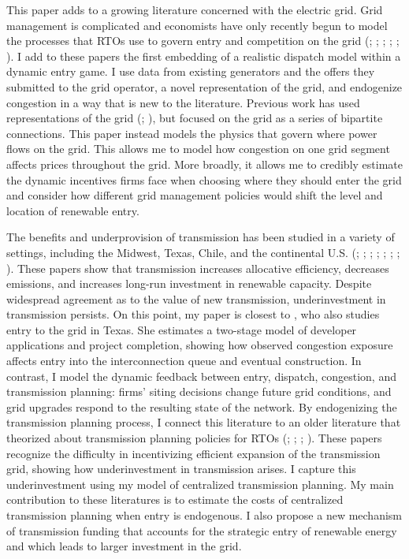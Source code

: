 \documentclass[12pt]{article}
\begin{document}
This paper adds to a growing literature concerned with the electric grid. Grid management is complicated and economists have only recently begun to model the processes that RTOs use to govern entry and competition on the grid (\cite{Wolak2015}; \cite{GowrisankaranReynoldsSamano2016}; \cite{Cicala2022}; \cite{Mays2023}; \cite{JohnstonLiuYang2024}; \cite{Boatwright2025}). I add to these papers the first embedding of a realistic dispatch model within a dynamic entry game. I use data from existing generators and the offers they submitted to the grid operator, a novel representation of the grid, and endogenize congestion in a way that is new to the literature. Previous work has used representations of the grid (\cite{ArkolakisWalsh2023}; \cite{Golden2026}), but focused on the grid as a series of bipartite connections. This paper instead models the physics that govern where power flows on the grid. This allows me to model how congestion on one grid segment affects prices throughout the grid. More broadly, it allows me to credibly estimate the dynamic incentives firms face when choosing where they should enter the grid and consider how different grid management policies would shift the level and location of renewable entry. 

The benefits and underprovision of transmission has been studied in a variety of settings, including the Midwest, Texas, Chile, and the continental U.S. (\cite{BorensteinBushnellStoft2000}; \cite{FellKafineNovan2021}; \cite{GonzalesItoReguant2023}; \cite{ArkolakisWalsh2023}; \cite{Hausman2024}; \cite{HollandMansurYates2024}; \cite{Boatwright2025}; \cite{Golden2026}). These papers show that transmission increases allocative efficiency, decreases emissions, and increases long-run investment in renewable capacity. Despite widespread agreement as to the value of new transmission, underinvestment in transmission persists. On this point, my paper is closest to \cite{Boatwright2025}, who also studies entry to the grid in Texas. She estimates a two-stage model of developer applications and project completion, showing how observed congestion exposure affects entry into the interconnection queue and eventual construction. In contrast, I model the dynamic feedback between entry, dispatch, congestion, and transmission planning: firms' siting decisions change future grid conditions, and grid upgrades respond to the resulting state of the network. By endogenizing the transmission planning process, I connect this literature to an older literature that theorized about transmission planning policies for RTOs (\cite{Leautier2000}; \cite{Vogelsang2001}; \cite{JoskowTirole2005}; \cite{HoganRosellonVogelsang2010}). These papers recognize the difficulty in incentivizing efficient expansion of the transmission grid, showing how underinvestment in transmission arises. I capture this underinvestment using my model of centralized transmission planning. My main contribution to these literatures is to estimate the costs of centralized transmission planning when entry is endogenous. I also propose a new mechanism of transmission funding that accounts for the strategic entry of renewable energy and which leads to larger investment in the grid.
\end{document}
